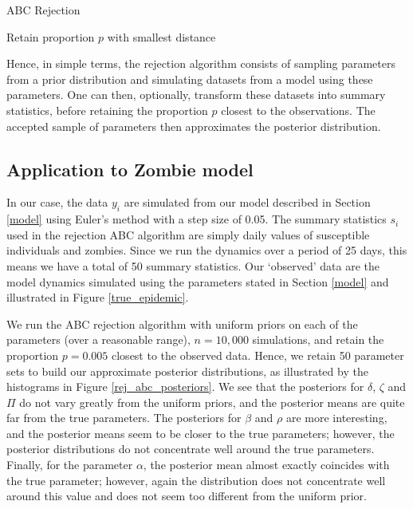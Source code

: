 \documentclass[]{article}
\begin{document}
\begin{algorithm}[H]
	\label{ABC Rejection} 
	\caption{ABC Rejection}
	Retain proportion $p$ with smallest distance
\end{algorithm}

\noindent Hence, in simple terms, the rejection algorithm consists of sampling parameters from a prior distribution and simulating datasets from a model using these parameters. One can then, optionally, transform these datasets into summary statistics, before retaining the proportion $p$ closest to the observations. The accepted sample of parameters then approximates the posterior distribution.

\subsection{Application to Zombie model}

In our case, the data $y_i$ are simulated from our model described in Section \ref{model} using Euler's method with a step size of 0.05. The summary statistics $s_i$ used in the rejection ABC algorithm are simply daily values of susceptible individuals and zombies. Since we run the dynamics over a period of 25 days, this means we have a total of 50 summary statistics. Our `observed' data are the model dynamics simulated using the parameters stated in Section \ref{model} and illustrated in Figure \ref{true_epidemic}.

We run the ABC rejection algorithm with uniform priors on each of the parameters (over a reasonable range), $n=10,000$ simulations, and retain the proportion $p=0.005$ closest to the observed data. Hence, we retain 50 parameter sets to build our approximate posterior distributions, as illustrated by the histograms in Figure \ref{rej_abc_posteriors}. We see that the posteriors for $\delta$, $\zeta$ and $\Pi$ do not vary greatly from the uniform priors, and the posterior means are quite far from the true parameters. The posteriors for $\beta$ and $\rho$ are more interesting, and the posterior means seem to be closer to the true parameters; however, the posterior distributions do not concentrate well around the true parameters. Finally, for the parameter $\alpha$, the posterior mean almost exactly coincides with the true parameter; however, again the distribution does not concentrate well around this value and does not seem too different from the uniform prior.
\end{document}
